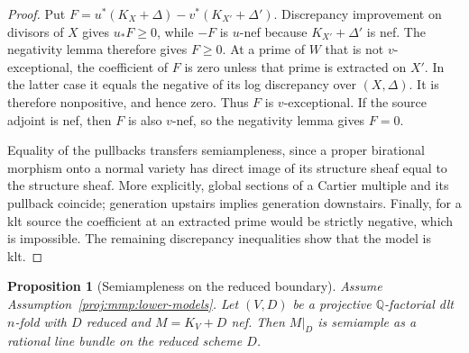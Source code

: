 \documentclass[11pt,letterpaper]{article}
\newtheorem{proposition}[theorem]{Proposition}
\theoremstyle{definition}
\theoremstyle{remark}
\begin{document}
\begin{proof}
Put \(F=u^*(K_X+\Delta)-v^*(K_{X'}+\Delta')\).
Discrepancy improvement on divisors of \(X\) gives \(u_*F\geq 0\),
while \(-F\) is \(u\)-nef because \(K_{X'}+\Delta'\) is nef.
The negativity lemma therefore gives \(F\geq 0\).
At a prime of \(W\) that is not \(v\)-exceptional, the coefficient
of \(F\) is zero unless that prime is extracted on \(X'\).
In the latter case it equals the negative of its log discrepancy
over \((X,\Delta)\). It is therefore nonpositive, and hence zero.
Thus \(F\) is \(v\)-exceptional. If the source adjoint is nef,
then \(F\) is also \(v\)-nef, so the negativity lemma gives \(F=0\).

Equality of the pullbacks transfers semiampleness, since a proper
birational morphism onto a normal variety has direct image of its
structure sheaf equal to the structure sheaf. More explicitly,
global sections of a Cartier multiple and its pullback coincide;
generation upstairs implies generation downstairs.
Finally, for a klt source the coefficient at an extracted prime
would be strictly negative, which is impossible. The remaining
discrepancy inequalities show that the model is klt.
\end{proof}

\begin{proposition}[Semiampleness on the reduced boundary]
\label{proj:prop:boundary-restriction}
Assume Assumption~\ref{proj:mmp:lower-models}. Let \((V,D)\) be a
projective \(\mathbb{Q}\)-factorial dlt \(n\)-fold with \(D\) reduced and
\(M=K_V+D\) nef. Then \(M|_D\) is semiample as a rational line
bundle on the reduced scheme \(D\).
\end{proposition}
\end{document}
